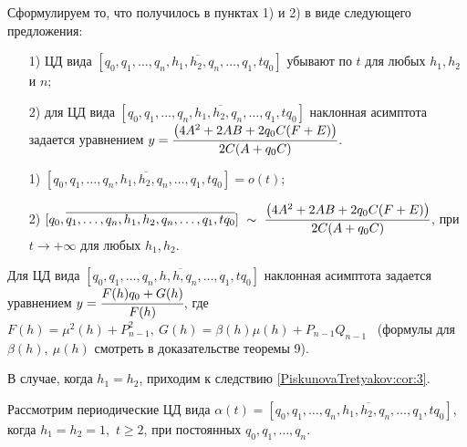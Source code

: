 Сформулируем то, что получилось в пунктах 1) и 2) в виде следующего предложения:
\begin{theoremr}\label{PiskunovaTretyakov:th:10}
\begin{enumerate}

\item[1)] ЦД вида $[{q_0},\overline{{q_1},\dots,{q_n},{h_{1}},{h_{2}},{q_n},\dots,{q_1},t{q_0}}]$ убывают по $t$ для любых ${h_{1}},{h_{2}}$ и $n$;
\item[2)] для ЦД вида $[{q_0},\overline{{q_1},\dots,{q_n},{h_{1}},{h_{2}},{q_n},\dots,{q_1},t{q_0}}]$ наклонная асимптота задается уравнением $y=\cfrac{\bigl(4A^{2}+2AB+2q_{0}C(F+E)\bigr)}{2C(A+q_{0}C)}$.
\end{enumerate}
\end{theoremr}


\begin{corollaryr}
\begin{enumerate}
\item[1) ]$[{q_0},\overline{{q_1},\dots,{q_n},{h_{1}},{h_{2}},{q_n},\dots,{q_1},t{q_0}}]=o(t)$;
\item[2) ]$[{q_0},\overline{{q_1},\dots,{q_n},{h_{1}},{h_{2}},{q_n},\dots,{q_1},t{q_0}}] \ \sim \ {\cfrac{\bigl(4A^{2}+2AB+2q_{0}C(F+E)\bigr)}{2C(A+q_{0}C)}}$, при ${t\to +\infty}$ для любых $h_{1},h_{2}$.
\end{enumerate}
\end{corollaryr}

\begin{corollaryr}
Для ЦД вида $[{q_0},\overline{{q_1},\dots,{q_n},h,h,{q_n},\dots,{q_1},t{q_0}}]$ наклонная асимптота задается уравнением $y=\cfrac{F(h)q_{0}+G(h)}{F(h)}$, где $F(h)=\mu^{2}(h)+P^{2}_{n-1}, \ G(h)=\beta(h)\mu(h)+P_{n-1}Q_{n-1}$ \ (формулы для $\beta(h), \ \mu(h)$ смотреть в доказательстве теоремы 9).
\end{corollaryr}

В случае, когда $h_1 = h_2$, приходим к следствию \ref{PiskunovaTretyakov:cor:3}.


Рассмотрим периодические ЦД вида $\alpha(t)=[{q_0},\overline{{q_1},\dots,{q_n},{h_1},{h_2},{q_n},\dots,{q_1},{t{q_0}}}]$,
когда \(h_1=h_2=1\),\ $t\geq 2$, при постоянных ${q_0},{q_1},\dots,{q_n}.$

